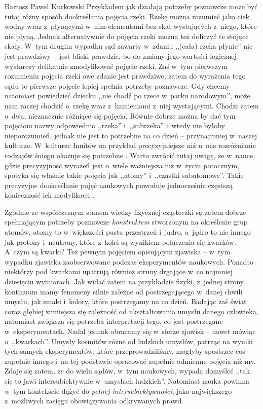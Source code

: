 \begin{artplenv}{Bartosz Paweł Kurkowski}
Przykładem jak działają potrzeby poznawcze może być tutaj różny sposób dookreślania pojęcia rzeki. Rzekę można rozumieć
jako ciek wodny wraz z~płynącymi w~nim elementami bez skał wystających z~niego, które nie płyną. Jednak alternatywnie
do pojęcia rzeki można też doliczyć te stojące skały. W~tym drugim wypadku sąd zawarty w~zdaniu ,,(cała) rzeka płynie''
nie jest prawdziwy -- jest bliski prawdzie, bo do zmiany jego wartości logicznej wystarczy delikatnie zmodyfikować
pojęcie rzeki. Zaś w~tym pierwszym rozumieniu pojęcia rzeki owe zdanie jest prawdziwe, zatem do wyrażenia tego sądu to
pierwsze pojęcie lepiej spełnia potrzeby poznawcze. Gdy chcemy natomiast powiedzieć dziecku ,,nie chodź po rzece w~parku
narodowym'', może nam raczej chodzić o~rzekę wraz z~kamieniami z~niej wystającymi. Chodzi zatem o~dwa, nieznacznie
różniące się pojęcia. Równie dobrze można by dać tym pojęciom nazwy odpowiednio ,,rzeka'' i~,,subrzeka'' i~wtedy nie byłoby
nieporozumień, jednak nie jest to potrzebne na co dzień -- przynajmniej w~naszej kulturze. W~kulturze Inuitów na
przykład precyzyjniejsze niż u~nas rozróżnianie rodzajów śniegu okazuje się potrzebne
\parencite[s.~148]{grobler_prawda_2000}.
Warto zwrócić tutaj uwagę, że w~nauce, gdzie precyzyjność wyrażeń jest
o~wiele ważniejsza niż w~życiu potocznym, spotyka się właśnie takie pojęcia jak ,,atomy'' i~,,cząstki subatomowe''. Takie
precyzyjne dookreślanie pojęć naukowych powoduje jednocześnie częstszą konieczność ich modyfikacji
\parencite[s.~118–122]{grobler_prawda_2000}.


Zgodnie ze współczesnym stanem wiedzy fizycznej cząsteczki są zatem dobrze spełniającym potrzeby poznawcze
\textit{konstruktem} stworzonym na określenie grup atomów, atomy to w~większości pusta przestrzeń i~jądro, a~jądro to
nic innego jak protony i~neutrony, które z~kolei są wynikiem połączenia się kwarków. A~czym są kwarki? Też pewnym
pojęciem opisującym zjawiska -- w~tym wypadku zjawiska zaobserwowane podczas eksperymentów naukowych. Ponadto niektórzy
pod kwarkami upatrują również struny drgające w~co najmniej dziesięciu wymiarach. Jak widać zatem na przykładzie
fizyki, z~jednej strony kontinuum mamy fenomeny silnie zależne od postrzegającego w~danej chwili umysłu, jak
smaki i~kolory, które postrzegamy na co dzień. Badając zaś świat coraz głębiej zmniejsza się zależność od ukształtowania umysłu
danego człowieka, natomiast zwiększa się potrzeba interpretacji tego, co jest postrzegane w~eksperymentach. Nadal
jednak obracamy się w~sferze zjawisk -- nawet mówiąc o~,,kwarkach''. Umysły kosmitów różne od ludzkich umysłów, patrząc na
wyniki tych samych eksperymentów, które przeprowadziliśmy, mogłyby spostrzec coś zupełnie innego i~na tej podstawie
opracować zupełnie odmienne pojęcia niż my. Zdaje się zatem, że do wielu sądów, w~tym naukowych, wypada domyśleć ,,tak
się to jawi intersubiektywnie w~umysłach ludzkich''. Natomiast nauka powinna w~tym kontekście dążyć do \textit{pełnej
intersubiektywności}, jako największego z~możliwych zasięgu obowiązywania odkrywanych prawd.



\end{artplenv}
